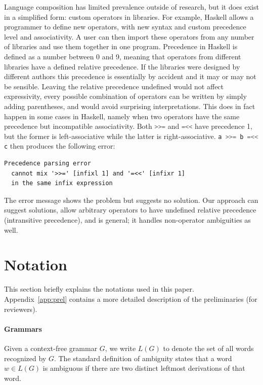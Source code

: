 \documentclass[runningheads]{llncs}
\newcommand{\haskell}{\lstinline[language=haskell]}
\begin{document}
Language composition has limited prevalence outside of research, but it does exist in a simplified form: custom operators in libraries. For example, Haskell allows a programmer to define new operators, with new syntax and custom precedence level and associativity. A user can then import these operators from any number of libraries and use them together in one program. Precedence in Haskell is defined as a number between 0 and 9, meaning that operators from different libraries have a defined relative precedence. If the libraries were designed by different authors this precedence is essentially by accident and it may or may not be sensible. Leaving the relative precedence undefined would not affect expressivity, every possible combination of operators can be written by simply adding parentheses, and would avoid surprising interpretations. This does in fact happen in some cases in Haskell, namely when two operators have the same precedence but incompatible associativity. Both \haskell{>>=} and \haskell{=<<} have precedence 1, but the former is left-associative while the latter is right-associative. \haskell{a >>= b =<< c} then produces the following error:

\begin{lstlisting}
Precedence parsing error
  cannot mix '>>=' [infixl 1] and '=<<' [infixr 1]
  in the same infix expression
\end{lstlisting}

\noindent The error message shows the problem but suggests no solution. Our approach can suggest solutions, allow arbitrary operators to have undefined relative precedence (intransitive precedence), and is general; it handles non-operator ambiguities as well.




\section{Notation}
\label{sec:prel}

This section briefly explains the notations used in this paper.
Appendix~\ref{app:prel} contains a more detailed description of
the preliminaries (for reviewers).


\paragraph{Grammars}
Given a context-free grammar $G$, we write $L(G)$ to denote the
set of all words recognized by $G$.
%
The standard definition of ambiguity states that a word
$w \in L(G)$ is ambiguous if there are two distinct leftmost
derivations of that word.
\end{document}
